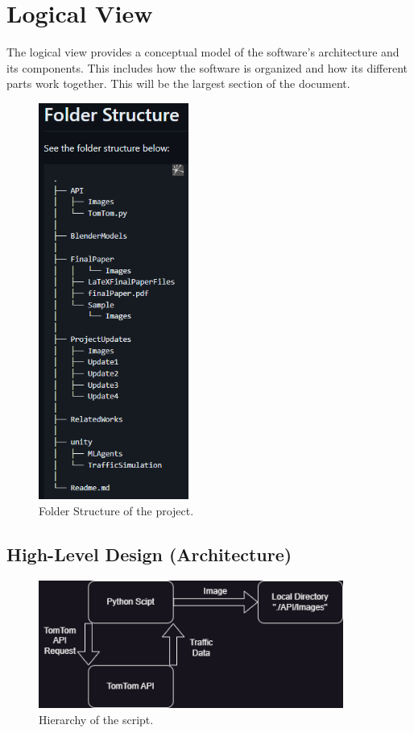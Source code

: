 \section{Logical View}

The logical view provides a conceptual model of the software's architecture and its components. 
This includes how the software is organized and how its different parts work together.
This will be the largest section of the document.

\begin{figure}[h]
    \centering
    \includegraphics[height=13cm]{Images/FolderStructure.png}
       \caption{Folder Structure of the project.}
           \label{Fig:ProjHier}
\end{figure}

\subsection{High-Level Design (Architecture)}

\begin{figure}[htb]
    \centering
    \includegraphics[width=10cm]{Images/TomTomLogFlow.png}
       \caption{Hierarchy of the script.}
           \label{Fig:TomTomHier}
\end{figure}

